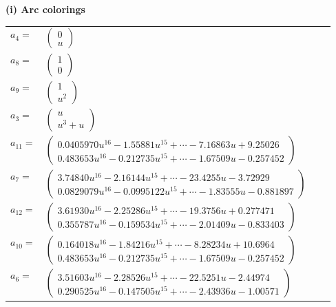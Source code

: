 \documentclass[1p]{elsarticle_modified}
\theoremstyle{definition}
\begin{document}
\flushleft \textbf{(i) Arc colorings}\\
\begin{tabular}{m{7pt} m{180pt} m{7pt} m{180pt} }
\flushright $a_{4}=$&$\begin{pmatrix}0\\u\end{pmatrix}$ \\
\flushright $a_{8}=$&$\begin{pmatrix}1\\0\end{pmatrix}$ \\
\flushright $a_{9}=$&$\begin{pmatrix}1\\u^2\end{pmatrix}$ \\
\flushright $a_{3}=$&$\begin{pmatrix}u\\u^3+u\end{pmatrix}$ \\
\flushright $a_{11}=$&$\begin{pmatrix}0.0405970 u^{16}-1.55881 u^{15}+\cdots-7.16863 u+9.25026\\0.483653 u^{16}-0.212735 u^{15}+\cdots-1.67509 u-0.257452\end{pmatrix}$ \\
\flushright $a_{7}=$&$\begin{pmatrix}3.74840 u^{16}-2.16144 u^{15}+\cdots-23.4255 u-3.72929\\0.0829079 u^{16}-0.0995122 u^{15}+\cdots-1.83555 u-0.881897\end{pmatrix}$ \\
\flushright $a_{12}=$&$\begin{pmatrix}3.61930 u^{16}-2.25286 u^{15}+\cdots-19.3756 u+0.277471\\0.355787 u^{16}-0.159534 u^{15}+\cdots-2.01409 u-0.833403\end{pmatrix}$ \\
\flushright $a_{10}=$&$\begin{pmatrix}0.164018 u^{16}-1.84216 u^{15}+\cdots-8.28234 u+10.6964\\0.483653 u^{16}-0.212735 u^{15}+\cdots-1.67509 u-0.257452\end{pmatrix}$ \\
\flushright $a_{6}=$&$\begin{pmatrix}3.51603 u^{16}-2.28526 u^{15}+\cdots-22.5251 u-2.44974\\0.290525 u^{16}-0.147505 u^{15}+\cdots-2.43936 u-1.00571\end{pmatrix}$ \\

\end{tabular}
\end{document}
